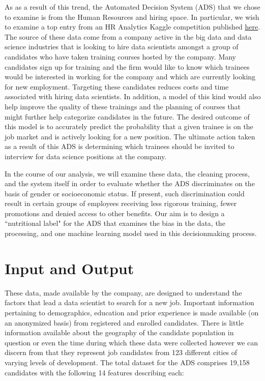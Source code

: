 \documentclass[11pt]{article}
\begin{document}
As as a result of this trend, the Automated Decision System (ADS) that we chose to examine is from the Human Resources and hiring space.  In particular, we wish to examine a top entry from an HR Analytics Kaggle competition published \href{https://www.kaggle.com/code/joshuaswords/awesome-hr-data-visualization-prediction/notebook}{here}.  The source of these data come from a company active in the big data and data science industries that is looking to hire data scientists amongst a group of candidates who have taken training courses hosted by the company.  Many candidates sign up for training and the firm would like to know which trainees would be interested in working for the company and which are currently looking for new employment.  Targeting these candidates reduces costs and time associated with hiring data scientists.  In addition, a model of this kind would also help improve the quality of these trainings and the planning of courses that might further help categorize candidates in the future.  The desired outcome of this model is to accurately predict the probability that a given trainee is on the job market and is actively looking for a new position.  The ultimate action taken as a result of this ADS is determining which trainees should be invited to interview for data science positions at the company.

In the course of our analysis, we will examine these data, the cleaning process, and the system itself in order to evaluate whether the ADS discriminates on the basis of gender or socioeconomic status. If present, such discrimination could result in certain groups of employees receiving less rigorous training, fewer promotions and denied access to other benefits. Our aim is to design a ``nutritional label" for the ADS that examines the bias in the data, the processing, and one machine learning model used in this decision\-making process. 


\pagebreak

\section{Input and Output}

These data, made available by the company, are designed to understand the factors that lead a data scientist to search for a new job.  Important information pertaining to demographics, education and prior experience is made available (on an anonymized basis) from registered and enrolled candidates.  There is little information available about the geography of the candidate population in question or even the time during which these data were collected however we can discern from that they represent job candidates from 123 different cities of varying levels of development.  The total dataset for the ADS comprises 19,158 candidates with the following 14 features describing each:
\end{document}
